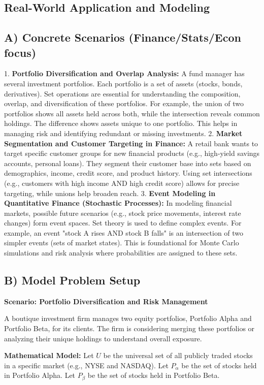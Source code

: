 \documentclass{article}
\begin{document}
\begin{itemize}
\begin{itemize}
\begin{itemize}
\begin{enumerate}
\begin{itemize}
\section{Real-World Application and Modeling}

\subsection{A) Concrete Scenarios (Finance/Stats/Econ focus)}
1.  \textbf{Portfolio Diversification and Overlap Analysis:} A fund manager has several investment portfolios. Each portfolio is a set of assets (stocks, bonds, derivatives). Set operations are essential for understanding the composition, overlap, and diversification of these portfolios. For example, the union of two portfolios shows all assets held across both, while the intersection reveals common holdings. The difference shows assets unique to one portfolio. This helps in managing risk and identifying redundant or missing investments.
2.  \textbf{Market Segmentation and Customer Targeting in Finance:} A retail bank wants to target specific customer groups for new financial products (e.g., high-yield savings accounts, personal loans). They segment their customer base into sets based on demographics, income, credit score, and product history. Using set intersections (e.g., customers with high income AND high credit score) allows for precise targeting, while unions help broaden reach.
3.  \textbf{Event Modeling in Quantitative Finance (Stochastic Processes):} In modeling financial markets, possible future scenarios (e.g., stock price movements, interest rate changes) form event spaces. Set theory is used to define complex events. For example, an event "stock A rises AND stock B falls" is an intersection of two simpler events (sets of market states). This is foundational for Monte Carlo simulations and risk analysis where probabilities are assigned to these sets.

\subsection{B) Model Problem Setup}
\textbf{Scenario: Portfolio Diversification and Risk Management}

A boutique investment firm manages two equity portfolios, Portfolio Alpha and Portfolio Beta, for its clients. The firm is considering merging these portfolios or analyzing their unique holdings to understand overall exposure.

\textbf{Mathematical Model:}
Let $U$ be the universal set of all publicly traded stocks in a specific market (e.g., NYSE and NASDAQ).
Let $P_\alpha$ be the set of stocks held in Portfolio Alpha.
Let $P_\beta$ be the set of stocks held in Portfolio Beta.


\end{itemize}
\end{enumerate}
\end{itemize}
\end{itemize}
\end{itemize}
\end{document}
